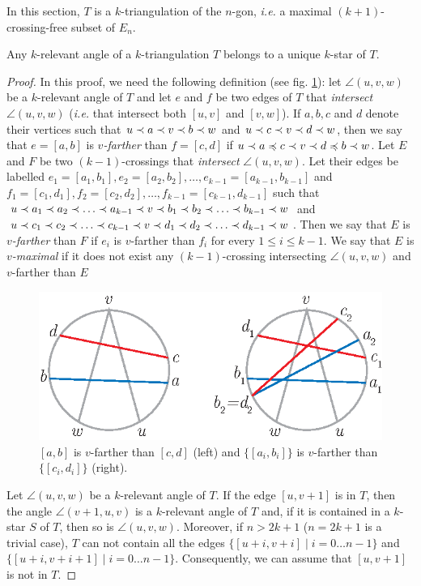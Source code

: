 \documentclass[12pt]{amsart}
\begin{document}
In this section, $T$ is a $k$-triangulation of the $n$-gon, {\it i.e.} a maximal $(k+1)$-crossing-free subset of $E_n$.

\begin{theorem}\label{angle}
Any $k$-relevant angle of a $k$-triangulation $T$ belongs to a unique $k$-star of $T$.
\end{theorem}


\begin{proof}
In this proof, we need the following definition (see fig. \ref{farther}): let $\angle(u,v,w)$ be a $k$-relevant angle of $T$ and let $e$ and $f$ be two edges of $T$ that \emph{intersect} $\angle(u,v,w)$ ({\it i.e.} that intersect both $[u,v]$ and $[v,w]$). If $a,b,c$ and $d$ denote their vertices such that $u\prec a\prec v\prec b\prec w$ and $u\prec c\prec v\prec d\prec w$, then we say that $e=[a,b]$ is \emph{$v$-farther} than $f=[c,d]$ if $u\prec a\preccurlyeq c\prec v\prec d\preccurlyeq b\prec w$. Let $E$ and $F$ be two $(k-1)$-crossings that \emph{intersect} $\angle(u,v,w)$. Let their edges be labelled $e_1=[a_1,b_1],e_2=[a_2,b_2],\ldots,e_{k-1}=[a_{k-1},b_{k-1}]$ and $f_1=[c_1,d_1],f_2=[c_2,d_2],\ldots,f_{k-1}=[c_{k-1},d_{k-1}]$ such that $u\prec a_1\prec a_2\prec \ldots\prec a_{k-1}\prec v\prec b_1\prec b_2\prec \ldots\prec b_{k-1}\prec w$ and $u\prec c_1\prec c_2\prec \ldots\prec c_{k-1}\prec v\prec d_1\prec d_2\prec \ldots\prec d_{k-1}\prec w$. Then we say that $E$ is \emph{$v$-farther} than $F$ if $e_i$ is $v$-farther than $f_i$ for every $1\le i\le k-1$. We say that $E$ is \emph{$v$-maximal} if it does not exist any $(k-1)$-crossing intersecting $\angle(u,v,w)$ and $v$-farther than $E$

\begin{figure}
\centerline{\includegraphics[scale=1]{farther.eps}}
\caption{\small{$[a,b]$ is $v$-farther than $[c,d]$ (left) and $\{[a_i,b_i]\}$ is $v$-farther than $\{[c_i,d_i]\}$ (right).}}\label{farther}
\end{figure}

Let $\angle(u,v,w)$ be a $k$-relevant angle of $T$. 
If the edge $[u,v+1]$ is in $T$, then the angle $\angle(v+1,u,v)$ is a $k$-relevant angle of $T$ and, if it is contained in a $k$-star $S$ of $T$, then so is $\angle(u,v,w)$. Moreover, if $n>2k+1$ ($n=2k+1$ is a trivial case), $T$ can not contain all the edges $\{[u+i,v+i]\;|\; i=0\ldots n-1\}$ and $\{[u+i,v+i+1]\;|\; i=0\ldots n-1\}$. Consequently, we can assume that $[u,v+1]$ is not in $T$.


\end{proof}
\end{document}
